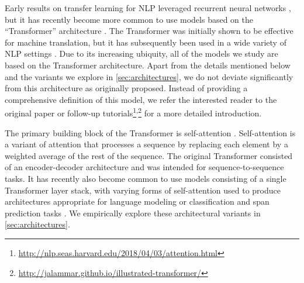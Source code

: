 \documentclass[twoside,11pt]{article}
\begin{document}
Early results on transfer learning for NLP leveraged recurrent neural networks \citep{peters2018deep,howard2018universal}, but it has recently become more common to use models based on the ``Transformer'' architecture \citep{vaswani2017attention}.
The Transformer was initially shown to be effective for machine translation, but it has subsequently been used in a wide variety of NLP settings \citep{radford2018improving,devlin2018bert,mccann2018natural,yu2018qanet}.
Due to its increasing ubiquity, all of the models we study are based on the Transformer architecture.
Apart from the details mentioned below and the variants we explore in \cref{sec:architectures}, we do not deviate significantly from this architecture as originally proposed.
Instead of providing a comprehensive definition of this model, we refer the interested reader to the original paper \citep{vaswani2017attention} or follow-up tutorials\footnote{\url{http://nlp.seas.harvard.edu/2018/04/03/attention.html}}\textsuperscript{,}\footnote{\url{http://jalammar.github.io/illustrated-transformer/}} for a more detailed introduction.

The primary building block of the Transformer is self-attention \citep{cheng2016long}.
Self-attention is a variant of attention \citep{graves2013generating,bahdanau2014neural} that processes a sequence by replacing each element by a weighted average of the rest of the sequence.
The original Transformer consisted of an encoder-decoder architecture and was intended for sequence-to-sequence \citep{sutskever2014sequence,kalchbrenner2014convolutional} tasks.
It has recently also become common to use models consisting of a single Transformer layer stack, with varying forms of self-attention used to produce architectures appropriate for language modeling \citep{radford2018improving,al2019character} or classification and span prediction tasks \citep{devlin2018bert,yang2019xlnet}.
We empirically explore these architectural variants in \cref{sec:architectures}.
\end{document}
